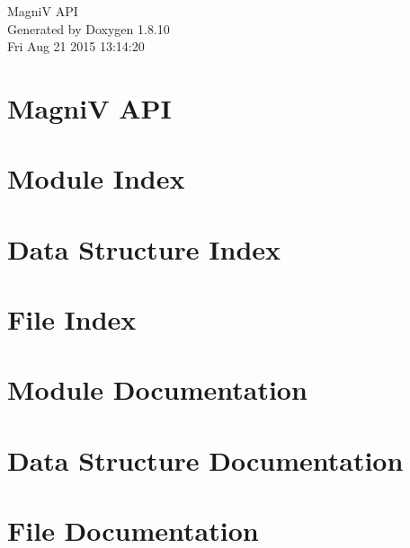\documentclass[twoside]{book}
\newcommand{\+}{\discretionary{\mbox{\scriptsize$\hookleftarrow$}}{}{}}
\newcommand{\clearemptydoublepage}{%
  \newpage{\pagestyle{empty}\cleardoublepage}%
}
\begin{document}
\hypersetup{pageanchor=false,
             bookmarks=true,
             bookmarksnumbered=true,
             pdfencoding=unicode
            }
\begin{titlepage}
\vspace*{7cm}
\begin{center}%
{\Large Magni\+V A\+P\+I }\\
\vspace*{1cm}
{\large Generated by Doxygen 1.8.10}\\
\vspace*{0.5cm}
{\small Fri Aug 21 2015 13:14:20}\\
\end{center}
\end{titlepage}
\clearemptydoublepage
\tableofcontents
\clearemptydoublepage
{}
\hypersetup{pageanchor=true}

\chapter{Magni\+V A\+P\+I}
\label{index}\hypertarget{index}{}
\chapter{Module Index}

\chapter{Data Structure Index}

\chapter{File Index}

\chapter{Module Documentation}








\chapter{Data Structure Documentation}
























\chapter{File Documentation}







\backmatter
\newpage
{}
\clearemptydoublepage
{}
\printindex
\end{document}
